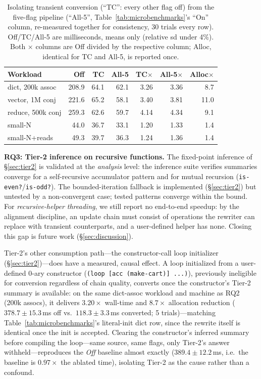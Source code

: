 \documentclass[sigplan,review,anonymous]{acmart}
\begin{document}
\begin{table}[h]
  \caption{Isolating transient conversion (``TC'': every other flag off)
  from the five-flag pipeline (``All-5'', Table~\ref{tab:microbenchmarks}'s
  ``On'' column, re-measured together for consistency, 30 trials every row).
  Off/TC/All-5 are milliseconds, means only (relative sd under 4\%). Both
  $\times$ columns are Off divided by the respective column; Alloc,
  identical for TC and All-5, is reported once.}
  \label{tab:tc-ablation}
  \footnotesize
  \setlength{\tabcolsep}{2pt}
  \begin{tabular}{@{}lrrrrrr@{}}
    \toprule
    Workload & Off & TC & All-5 & TC$\times$ & All-5$\times$ & Alloc$\times$ \\
    \midrule
    dict, 200k assoc  & 208.9 & 64.1 & 62.1 & 3.26 & 3.36 & 8.7 \\
    vector, 1M conj    & 221.6 & 65.2 & 58.1 & 3.40 & 3.81 & 11.0 \\
    reduce, 500k conj  & 259.3 & 62.6 & 59.7 & 4.14 & 4.34 & 9.1 \\
    small-N            & 44.0  & 36.7 & 33.1 & 1.20 & 1.33 & 1.4 \\
    small-N+reads      & 49.3  & 39.7 & 36.3 & 1.24 & 1.36 & 1.4 \\
  \bottomrule
\end{tabular}
\end{table}

\textbf{RQ3: Tier-2 inference on recursive functions.} The fixed-point inference of §\ref{sec:tier2} is validated at the \emph{analysis} level: the inference suite verifies summaries converge for a self-recursive accumulator pattern and for mutual recursion (\texttt{is-even?}/\texttt{is-odd?}). The bounded-iteration fallback is implemented (§\ref{sec:tier2}) but untested by a non-convergent case; tested patterns converge within the bound. For \emph{recursive-helper threading}, we still report no end-to-end speedup: by the alignment discipline, an update chain must consist of operations the rewriter can replace with transient counterparts, and a user-defined helper has none. Closing this gap is future work (§\ref{sec:discussion}).

Tier-2's other consumption path---the constructor-call loop initializer (§\ref{sec:tier2})---does have a measured, causal effect. A loop initialized from a user-defined 0-ary constructor (\texttt{(loop [acc (make-cart)] ...)}), previously ineligible for conversion regardless of chain quality, converts once the constructor's Tier-2 summary is available: on the same dict-assoc workload and machine as RQ2 (200k assocs), it delivers $3.20\times$ wall-time and $8.7\times$ allocation reduction ($378.7\pm15.3$\,ms off vs.\ $118.3\pm3.3$\,ms converted; 5 trials)---matching Table~\ref{tab:microbenchmarks}'s literal-init dict row, since the rewrite itself is identical once the init is accepted. Clearing the constructor's inferred summary before compiling the loop---same source, same flags, only Tier-2's answer withheld---reproduces the \emph{Off} baseline almost exactly ($389.4\pm12.2$\,ms, i.e.\ the baseline is $0.97\times$ the ablated time), isolating Tier-2 as the cause rather than a confound.
\end{document}

